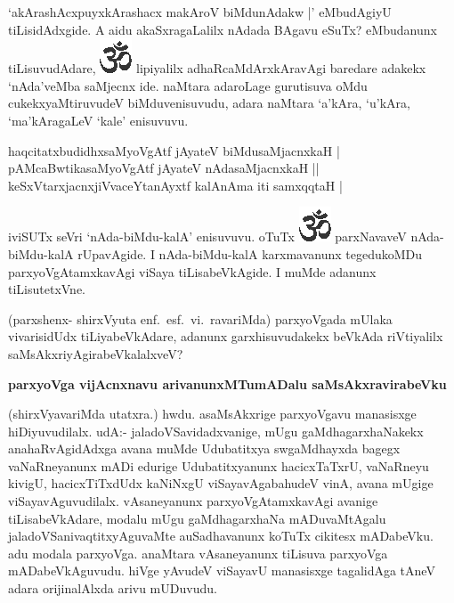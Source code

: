 `akArashAcxpuyxkArashacx makAroV biMdunAdakw |' eMbudA\-giyU tiLisidAdxgide. A aidu akaSxragaLalilx nAdada BAgavu eSuTx? eMbudanunx tiLisuvudAdare, {\includegraphics[scale=.6]{om.eps}} lipiyalilx adhaRcaMdArxkAravAgi baredare adakekx `nAda'veMba saMjecnx ide. naMtara adaroLage gurutisuva oMdu cukekxyaMtiruvudeV biMduvenisuvudu, adara naMtara `a'kAra, `u'kAra, `ma'kAragaLeV `kale' enisuvuvu. 

\begin{shloka}
haqcitatxbudidhxsaMyoVgAtf jAyateV biMdusaMjacnxkaH |\\\label{161}
pAMcaBwtikasaMyoVgAtf jAyateV nAdasaMjacnxkaH ||\\
keSxVtarxjacnxjiVvaceYtanAyxtf kalAnAma iti samxqqtaH |
\end{shloka}

\noindent
iviSUTx seVri `nAda-biMdu-kalA' enisuvuvu. oTuTx {\includegraphics[scale=.6]{om.eps}} parxNavaveV nAda-biMdu\break-kalA rUpa\-vAgide. I nAda-\-biMdu\--kalA karxmavanunx tegedukoMDu parxyoV\-gAtamxka\-vAgi viSaya tiLisabeVkA\-gide. I muMde adanunx tiLisutetxVne.

(parxshenx- shirxVyuta enf.~esf.~vi.~ravariMda) parxyoVgada mUlaka vivarisidUdx tiLiyabeVkA\-dare, adanunx garxhisuvudakekx beVkAda riVtiyalilx saMsAkxriyAgira\break\-beVkalalxveV?

{\bigskip
\noindent
{\large\bf parxyoVga vijAcnxnavu arivanunxMTumADalu saMsAkxravirabeVku}}
\medskip

\noindent
(shirxVyavariMda utatxra.) hwdu. asaMsAkxrige parxyoVgavu manasisxge hiDiyuvudilalx. udA:- jala\-doVSavidadxvanige, mUgu gaMdhagarxhaNakekx anahaRvAgidAdxga avana muMde Udubatitxya swgaM\-dhayxda bagegx vaNaRneyanunx mADi edurige Udubatitxyanunx hacicxTaTxrU, vaNaRneyu kivigU, hacicx\-TiTxdUdx kaNiNxgU viSayavAgabahudeV vinA, avana mUgige viSayavAguvudilalx. vAsaneyanunx parxyoV\-gAtamxkavAgi avanige tiLisabeVkAdare, modalu mUgu gaMdhagarxhaNa mADuvaMtAgalu jaladoVSa\-nivaqtitx\-yAguvaMte auSadhavanunx koTuTx cikitesx mADabeVku. adu modala parxyoVga. anaMtara vAsane\-yanunx tiLisuva parxyoVga mADabeVkAguvudu. hiVge yAvudeV viSayavU manasisxge tagalidAga tAneV adara orijinalAlxda arivu mUDuvudu.

